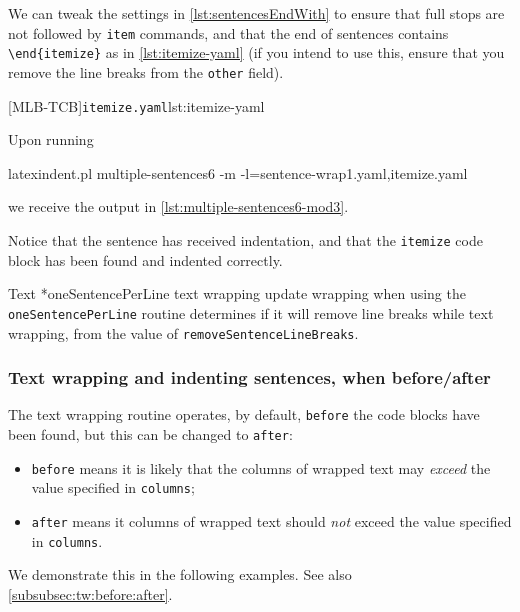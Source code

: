  \begin{example}
 We can tweak the settings in \vref{lst:sentencesEndWith} to ensure that full stops are
 not followed by \texttt{item} commands, and that the end of sentences contains
 \lstinline!\end{itemize}! as in \cref{lst:itemize-yaml} (if you intend to use this,
 ensure that you remove the line breaks from the \texttt{other} field).  
  

 [MLB-TCB]{\texttt{itemize.yaml}}{lst:itemize-yaml}

 Upon running  

 \begin{commandshell}
latexindent.pl multiple-sentences6 -m -l=sentence-wrap1.yaml,itemize.yaml
\end{commandshell}

 we receive the output in \cref{lst:multiple-sentences6-mod3}.


 Notice that the sentence has received indentation, and that the \texttt{itemize} code
 block has been found and indented correctly.
 \end{example}

 Text *{oneSentencePerLine text wrapping update} wrapping when using
 the \texttt{oneSentencePerLine} routine determines if it will remove line breaks while
 text wrapping, from the value of \texttt{removeSentenceLineBreaks}.

\subsubsection{Text wrapping and indenting sentences, when before/after}\label{subsubsec:ospl:before:after}
 The text wrapping routine operates, by default, \texttt{before} the  code blocks have been found, but this can be changed to
 \texttt{after}:
 \begin{itemize}
  \item \texttt{before} means it is likely that the columns of wrapped text may \emph{exceed} the
        value specified in \texttt{columns};
  \item \texttt{after} means it columns of wrapped text should \emph{not} exceed the value
        specified in \texttt{columns}.
 \end{itemize}
 We demonstrate this in the following examples. See also
 \cref{subsubsec:tw:before:after}.

